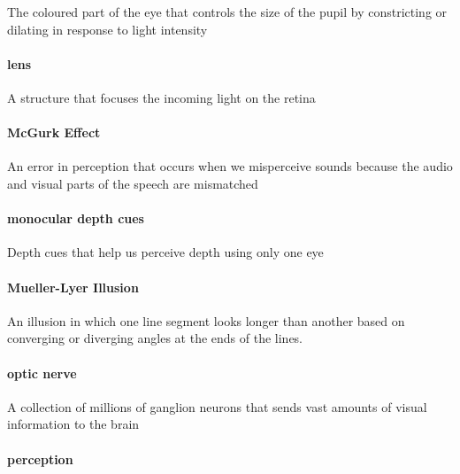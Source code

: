 \documentclass[
]{krantz}
\begin{document}
The coloured part of the eye that controls the size of the pupil by constricting or dilating in response to light intensity

\hypertarget{lens}{%
\paragraph*{lens}\label{lens}}

A structure that focuses the incoming light on the retina

\hypertarget{mcgurk-effect}{%
\paragraph*{McGurk Effect}\label{mcgurk-effect}}

An error in perception that occurs when we misperceive sounds because the audio and visual parts of the speech are mismatched

\hypertarget{monocular-depth-cues}{%
\paragraph*{monocular depth cues}\label{monocular-depth-cues}}

Depth cues that help us perceive depth using only one eye

\hypertarget{mueller-lyer-illusion}{%
\paragraph*{Mueller-Lyer Illusion}\label{mueller-lyer-illusion}}

An illusion in which one line segment looks longer than another based on converging or diverging angles at the ends of the lines.

\hypertarget{optic-nerve}{%
\paragraph*{optic nerve}\label{optic-nerve}}

A collection of millions of ganglion neurons that sends vast amounts of visual information to the brain

\hypertarget{perception-1}{%
\paragraph*{perception}\label{perception-1}}
\end{document}
